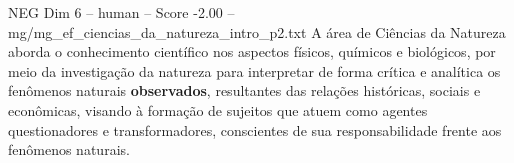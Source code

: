 \begin{textsample}{NEG Dim 6 – human – Score -2.00 – mg/mg\_ef\_ciencias\_da\_natureza\_intro\_p2.txt}  \label{ex:f6_neg_018}
A área de Ciências da Natureza aborda o conhecimento científico nos aspectos físicos, químicos e biológicos, por meio da investigação da natureza para interpretar de forma crítica e analítica os fenômenos naturais \textbf{observados}, resultantes das relações históricas, sociais e econômicas, visando à formação de sujeitos que atuem como agentes questionadores e transformadores, conscientes de sua responsabilidade frente aos fenômenos naturais.

\end{textsample}
